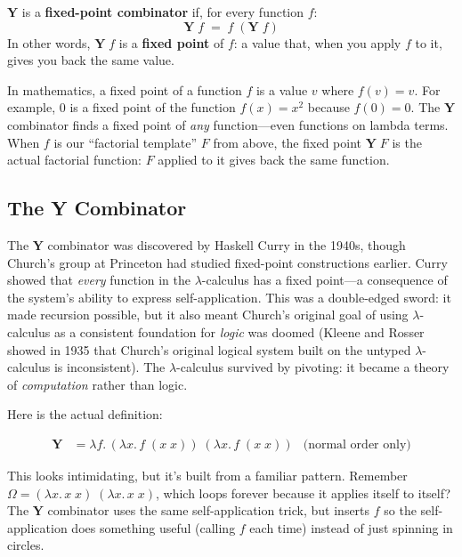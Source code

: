 \documentclass[11pt,a4paper]{article}
\theoremstyle{definition}
\newcommand{\lam}{\lambda}
\begin{document}
\begin{defnbox}
$\mathbf{Y}$ is a \textbf{fixed-point combinator} if, for every function $f$:
\[
  \mathbf{Y}\; f \;=\; f\;(\mathbf{Y}\; f)
\]
In other words, $\mathbf{Y}\;f$ is a \textbf{fixed point} of $f$: a value
that, when you apply $f$ to it, gives you back the same value.
\end{defnbox}

\begin{intuition}
In mathematics, a fixed point of a function $f$ is a value $v$ where
$f(v) = v$. For example, 0 is a fixed point of the function $f(x) = x^2$
because $f(0) = 0$. The $\mathbf{Y}$ combinator finds a fixed point of
\emph{any} function---even functions on lambda terms. When $f$ is our
``factorial template'' $F$ from above, the fixed point
$\mathbf{Y}\;F$ is the actual factorial function: $F$ applied to it gives back
the same function.
\end{intuition}

\subsection{The Y Combinator}

The $\mathbf{Y}$ combinator was discovered by Haskell Curry in the 1940s,
though Church's group at Princeton had studied fixed-point constructions
earlier. Curry showed that \emph{every} function in the $\lam$-calculus has a
fixed point---a consequence of the system's ability to express self-application.
This was a double-edged sword: it made recursion possible, but it also meant
Church's original goal of using $\lam$-calculus as a consistent foundation for
\emph{logic} was doomed (Kleene and Rosser showed in 1935 that Church's
original logical system built on the untyped $\lam$-calculus is inconsistent). The $\lam$-calculus survived by
pivoting: it became a theory of \emph{computation} rather than logic.

Here is the actual definition:

\begin{align*}
\mathbf{Y} &= \lam f.\, (\lam x.\, f\;(x\;x))\;(\lam x.\, f\;(x\;x))
  & \text{(normal order only)}
\end{align*}

This looks intimidating, but it's built from a familiar pattern. Remember
$\Omega = (\lam x.\, x\;x)\;(\lam x.\, x\;x)$, which loops forever because
it applies itself to itself? The $\mathbf{Y}$ combinator uses the same
self-application trick, but inserts $f$ so the self-application does something
useful (calling $f$ each time) instead of just spinning in circles.
\end{document}
